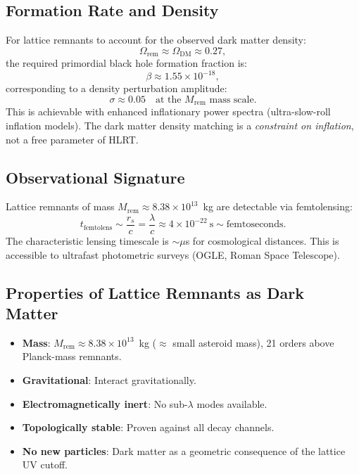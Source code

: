 \documentclass[11pt,letterpaper]{article}
\begin{document}
\subsection{Formation Rate and Density}

For lattice remnants to account for the observed dark matter density:
\begin{equation}
  \Omega_\mathrm{rem} \approx \Omega_\mathrm{DM} \approx 0.27,
\end{equation}
the required primordial black hole formation fraction is:
\begin{equation}
  \beta \approx 1.55\times10^{-18},
\end{equation}
corresponding to a density perturbation amplitude:
\begin{equation}
  \sigma \approx 0.05 \quad \text{at the }M_\mathrm{rem}\text{ mass scale.}
\end{equation}
This is achievable with enhanced inflationary power spectra
(ultra-slow-roll inflation models).  The dark matter density matching
is a \emph{constraint on inflation}, not a free parameter of HLRT.

\subsection{Observational Signature}

Lattice remnants of mass $M_\mathrm{rem}\approx8.38\times10^{13}$~kg are
detectable via femtolensing:
\begin{equation}
  t_\mathrm{femtolens} \sim \frac{r_s}{c}
  = \frac{\lambda}{c}
  \approx 4\times10^{-22}~\text{s} \sim \text{femtoseconds}.
\end{equation}
The characteristic lensing timescale is $\sim\mu$s for cosmological
distances.  This is accessible to ultrafast photometric surveys (OGLE,
Roman Space Telescope).

\subsection{Properties of Lattice Remnants as Dark Matter}

\begin{itemize}[nosep]
  \item \textbf{Mass}: $M_\mathrm{rem}\approx8.38\times10^{13}$~kg
        ($\approx$ small asteroid mass), 21 orders above Planck-mass remnants.
  \item \textbf{Gravitational}: Interact gravitationally.
  \item \textbf{Electromagnetically inert}: No sub-$\lambda$ modes available.
  \item \textbf{Topologically stable}: Proven against all decay channels.
  \item \textbf{No new particles}: Dark matter as a geometric consequence
        of the lattice UV cutoff.
\end{itemize}
\end{document}
